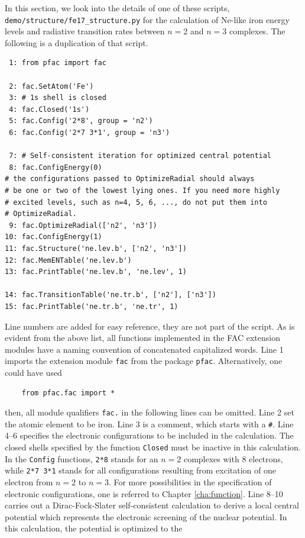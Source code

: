 \documentclass[twoside,letterpaper]{refrep}
\begin{document}
In this section, we look into the details of one of these scripts,
\verb|demo/structure/fe17_structure.py| for the calculation of Ne-like iron
energy levels and radiative transition rates between $n = 2$ and $n = 3$
complexes. The following is a duplication of that script.
\begin{verbatim}
 1: from pfac import fac

 2: fac.SetAtom('Fe')
 3: # 1s shell is closed
 4: fac.Closed('1s')
 5: fac.Config('2*8', group = 'n2')
 6: fac.Config('2*7 3*1', group = 'n3')

 7: # Self-consistent iteration for optimized central potential
 8: fac.ConfigEnergy(0)
# the configurations passed to OptimizeRadial should always
# be one or two of the lowest lying ones. If you need more highly
# excited levels, such as n=4, 5, 6, ..., do not put them into
# OptimizeRadial.
 9: fac.OptimizeRadial(['n2', 'n3'])
10: fac.ConfigEnergy(1)
11: fac.Structure('ne.lev.b', ['n2', 'n3'])
12: fac.MemENTable('ne.lev.b')
13: fac.PrintTable('ne.lev.b', 'ne.lev', 1)

14: fac.TransitionTable('ne.tr.b', ['n2'], ['n3'])
15: fac.PrintTable('ne.tr.b', 'ne.tr', 1)
\end{verbatim}
Line numbers are added for easy reference, they are not part of the script. 
As is evident from the above list, all functions implemented in the FAC
extension modules have a naming convention of concatenated capitalized words.
Line 1 imports the extension module \verb|fac| from the package \verb|pfac|.
Alternatively, one could have used
\begin{verbatim}
    from pfac.fac import *
\end{verbatim}
then, all module qualifiers \verb|fac.| in the following lines can be omitted.
Line 2 set the atomic element to be iron. Line 3 is a comment, which starts
with a \verb|#|. Line 4--6 specifies the electronic configurations to be
included in the calculation. The closed shells specified by the function
\verb|Closed| must be inactive in this calculation. In the \verb|Config|
functions, \verb|2*8| stands for an $n = 2$ complexes with 8 electrons, while
\verb|2*7 3*1| stands for all configurations resulting from excitation of one
electron from $n = 2$ to $n = 3$. For more possibilities in the specification
of electronic configurations, one is referred to Chapter \ref{cha:function}.
Line 8--10 carries out a Dirac-Fock-Slater self-consistent calculation to
derive a local central potential which represents the electronic screening of
the nuclear potential. In this calculation, the potential is optimized to the
\end{document}
